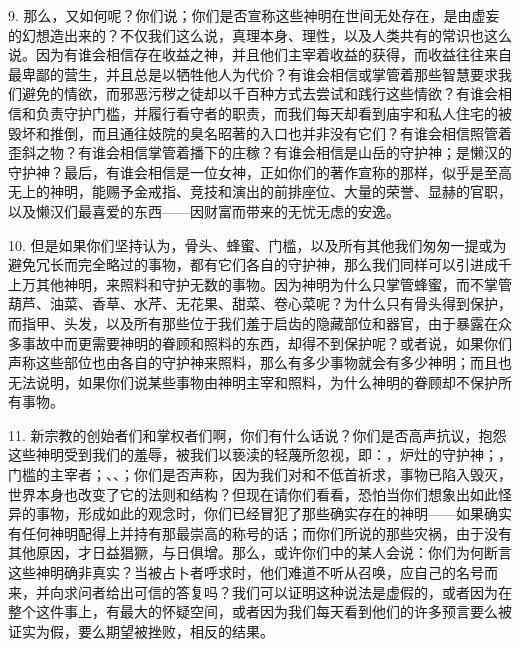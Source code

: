 9. 那么，又如何呢？你们说；你们是否宣称这些神明在世间无处存在，是由虚妄的幻想造出来的？不仅我们这么说，真理本身、理性，以及人类共有的常识也这么说。因为有谁会相信存在收益之神，并且他们主宰着收益的获得，而收益往往来自最卑鄙的营生，并且总是以牺牲他人为代价？有谁会相信或掌管着那些智慧要求我们避免的情欲，而邪恶污秽之徒却以千百种方式去尝试和践行这些情欲？有谁会相信和负责守护门槛，并履行看守者的职责，而我们每天却看到庙宇和私人住宅的被毁坏和推倒，而且通往妓院的臭名昭著的入口也并非没有它们？有谁会相信照管着歪斜之物？有谁会相信掌管着播下的庄稼？有谁会相信是山岳的守护神；是懒汉的守护神？最后，有谁会相信是一位女神，正如你们的著作宣称的那样，似乎是至高无上的神明，能赐予金戒指、竞技和演出的前排座位、大量的荣誉、显赫的官职，以及懒汉们最喜爱的东西——因财富而带来的无忧无虑的安逸。\par

10. 但是如果你们坚持认为，骨头、蜂蜜、门槛，以及所有其他我们匆匆一提或为避免冗长而完全略过的事物，都有它们各自的守护神，那么我们同样可以引进成千上万其他神明，来照料和守护无数的事物。因为神明为什么只掌管蜂蜜，而不掌管葫芦、油菜、香草、水芹、无花果、甜菜、卷心菜呢？为什么只有骨头得到保护，而指甲、头发，以及所有那些位于我们羞于启齿的隐藏部位和器官，由于暴露在众多事故中而更需要神明的眷顾和照料的东西，却得不到保护呢？或者说，如果你们声称这些部位也由各自的守护神来照料，那么有多少事物就会有多少神明；而且也无法说明，如果你们说某些事物由神明主宰和照料，为什么神明的眷顾却不保护所有事物。\par

11. 新宗教的创始者们和掌权者们啊，你们有什么话说？你们是否高声抗议，抱怨这些神明受到我们的羞辱，被我们以亵渎的轻蔑所忽视，即：，炉灶的守护神；，门槛的主宰者；、、；你们是否声称，因为我们对和不低首祈求，事物已陷入毁灭，世界本身也改变了它的法则和结构？但现在请你们看看，恐怕当你们想象出如此怪异的事物，形成如此的观念时，你们已经冒犯了那些确实存在的神明——如果确实有任何神明配得上并持有那最崇高的称号的话；而你们所说的那些灾祸，由于没有其他原因，才日益猖獗，与日俱增。那么，或许你们中的某人会说：你们为何断言这些神明确非真实？当被占卜者呼求时，他们难道不听从召唤，应自己的名号而来，并向求问者给出可信的答复吗？我们可以证明这种说法是虚假的，或者因为在整个这件事上，有最大的怀疑空间，或者因为我们每天看到他们的许多预言要么被证实为假，要么期望被挫败，相反的结果。\par

